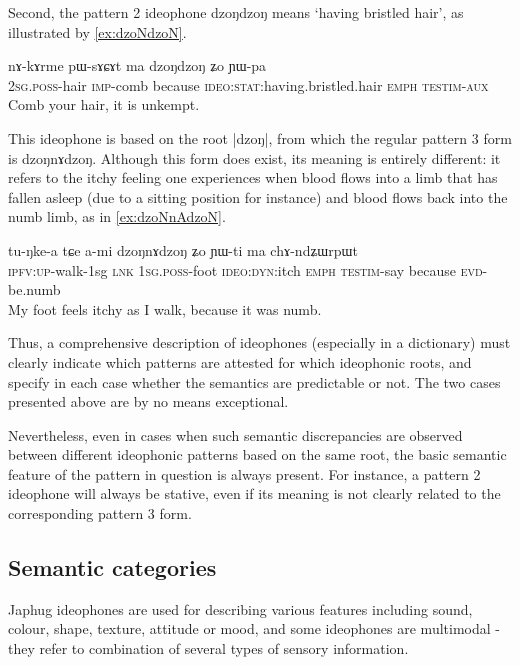 \documentclass[oldfontcommands,oneside,a4paper,11pt]{article}
\newcommand{\ipa}[1]{{\phon \mbox{#1}}} %
\begin{document}
Second, the  pattern 2 ideophone \ipa{dzoŋdzoŋ} means `having bristled hair', as illustrated by \ref{ex:dzoNdzoN}. 

  \begin{exe} 
\ex  \label{ex:dzoNdzoN}
\gll 
\ipa{nɤ-kɤrme}  	\ipa{pɯ-sɤɕɤt}  	\ipa{ma}  	\ipa{dzoŋdzoŋ}  	\ipa{ʑo}  	\ipa{ɲɯ-pa}  \\
\textsc{2sg.poss}-hair \textsc{imp}-comb because \textsc{ideo:stat}:having.bristled.hair \textsc{emph} \textsc{testim}-\textsc{aux} \\
\glt Comb your hair, it is unkempt.
  \end{exe}

This ideophone is based on the root |\ipa{dzoŋ}|, from which the regular pattern 3 form is \ipa{dzoŋnɤdzoŋ}. Although this form does exist, its meaning is entirely different: it refers to the itchy feeling  one experiences when blood flows into a limb that has fallen asleep (due to a sitting position for instance) and blood flows back into the numb limb, as in \ref{ex:dzoNnAdzoN}.

  \begin{exe} 
\ex  \label{ex:dzoNnAdzoN}
\gll 
\ipa{tu-ŋke-a}  	\ipa{tɕe}  	\ipa{a-mi}  	\ipa{dzoŋnɤdzoŋ}  	\ipa{ʑo}  	\ipa{ɲɯ-ti}  	\ipa{ma}  	\ipa{chɤ-ndʑɯrpɯt}  \\
\textsc{ipfv:up}-walk-1sg \textsc{lnk} 1\textsc{sg.poss}-foot \textsc{ideo:dyn}:itch \textsc{emph} \textsc{testim}-say because \textsc{evd}-be.numb \\
\glt My foot feels itchy as I walk, because it was numb.
  \end{exe}
  
  
 Thus, a comprehensive description of ideophones (especially in a dictionary) must clearly indicate which patterns are attested for which ideophonic roots, and specify in each case whether the semantics are predictable or not. The two cases presented above are by no means exceptional.


Nevertheless, even in cases when such semantic discrepancies are observed between different ideophonic patterns based on the same root, the basic semantic feature of the pattern in question is always present. For instance, a pattern 2 ideophone will always be stative, even if its meaning is not clearly related to the corresponding pattern 3 form.

\subsection{Semantic categories}
Japhug ideophones are used for describing various features including sound, colour, shape, texture, attitude or mood, and some ideophones are multimodal - they refer to combination of several types of sensory information.
\end{document}
